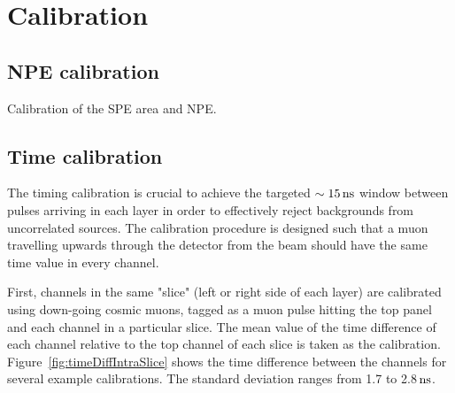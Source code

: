 \documentclass[12pt]{article}
\newcommand{\unit}[1]{\ensuremath{\text{\,#1}}\xspace}
\begin{document}
\section{Calibration}

\subsection{NPE calibration}
\label{sec:npeCalibration}
Calibration of the SPE area and NPE.

\subsection{Time calibration}
\label{sec:timeCalibration}

The timing calibration is crucial to achieve the targeted $\sim15\unit{ns}$ window between pulses arriving in each layer
in order to effectively reject backgrounds from uncorrelated sources. The calibration
procedure is designed such that a muon travelling upwards through the detector 
from the beam should have the same time
value in every channel.

First, channels in the same "slice" (left or right side of each layer) are calibrated 
using down-going cosmic muons, tagged as a muon pulse hitting the top panel and 
each channel in a particular slice. The mean value of the time difference of each channel relative to the top channel of each slice 
is taken as the calibration. Figure~\ref{fig:timeDiffIntraSlice} shows the time difference between the channels for several example calibrations.
The standard deviation ranges from 1.7 to 2.8\unit{ns}.
\end{document}
